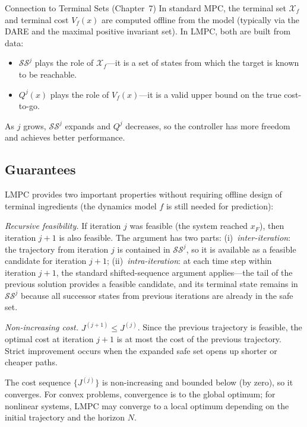\begin{notebox}{Connection to Terminal Sets (Chapter~7)}
	In standard MPC, the terminal set $\mathcal{X}_f$ and terminal cost $V_f(x)$ are computed offline from the model (typically via the DARE and the maximal positive invariant set). In LMPC, both are built from data:
	\begin{itemize}[noitemsep]
		\item $\mathcal{SS}^j$ plays the role of $\mathcal{X}_f$---it is a set of states from which the target is known to be reachable.
		\item $Q^j(x)$ plays the role of $V_f(x)$---it is a valid upper bound on the true cost-to-go.
	\end{itemize}
	As $j$ grows, $\mathcal{SS}^j$ expands and $Q^j$ decreases, so the controller has more freedom and achieves better performance.
\end{notebox}

\subsection{Guarantees}
\label{sec:lmpc_guarantees}

LMPC provides two important properties without requiring offline design of terminal ingredients (the dynamics model $f$ is still needed for prediction):

\emph{Recursive feasibility.} If iteration $j$ was feasible (the system reached $x_F$), then iteration $j+1$ is also feasible. The argument has two parts: (i)~\emph{inter-iteration}: the trajectory from iteration $j$ is contained in $\mathcal{SS}^j$, so it is available as a feasible candidate for iteration $j+1$; (ii)~\emph{intra-iteration}: at each time step within iteration $j+1$, the standard shifted-sequence argument applies---the tail of the previous solution provides a feasible candidate, and its terminal state remains in $\mathcal{SS}^j$ because all successor states from previous iterations are already in the safe set.

\emph{Non-increasing cost.} $J^{(j+1)} \le J^{(j)}$. Since the previous trajectory is feasible, the optimal cost at iteration $j+1$ is at most the cost of the previous trajectory. Strict improvement occurs when the expanded safe set opens up shorter or cheaper paths.

The cost sequence $\{J^{(j)}\}$ is non-increasing and bounded below (by zero), so it converges. For convex problems, convergence is to the global optimum; for nonlinear systems, LMPC may converge to a local optimum depending on the initial trajectory and the horizon $N$.


